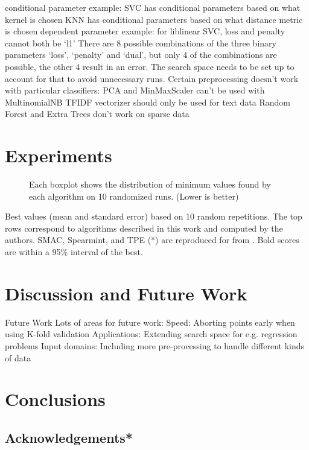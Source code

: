 \documentclass[wcp]{jmlr}
\begin{document}
conditional parameter example:
SVC has conditional parameters based on what kernel is chosen
KNN has conditional parameters based on what distance metric is chosen
dependent parameter example:
for liblinear SVC, loss and penalty cannot both be ‘l1’
There are 8 possible combinations of the three binary parameters ‘loss’, ‘penalty’ and ‘dual’, but only 4 of the combinations are possible, the other 4 result in an error. The search space needs to be set up to account for that to avoid unnecessary runs.
Certain preprocessing doesn’t work with particular classifiers:
PCA and MinMaxScaler can’t be used with MultinomialNB
TFIDF vectorizer should only be used for text data
Random Forest and Extra Trees don’t work on sparse data


\section{Experiments}

\begin{figure}
    \centering
    \caption{
        Each boxplot shows the distribution of minimum values found by each algorithm on 10 randomized runs. (Lower is better)
    }
    \label{fig:boxplots}
\end{figure}



\begin{table}
    \caption{
        Best values (mean and standard error) based on 10 random repetitions.
        The top rows correspond to algorithms described in this work and computed by the authors.
        SMAC, Spearmint, and TPE (*) are reproduced for from \citet{eggensperger+etal:2013}.
        Bold scores are within a 95\% interval of the best.
    }
    \label{tbl:acc}
    \centering
    \small
\end{table}



\section{Discussion and Future Work}
Future Work
Lots of areas for future work:
Speed: Aborting points early when using K-fold validation
Applications: Extending search space for e.g. regression problems
Input domains: Including more pre-processing to handle different kinds of data


\section{Conclusions}


\subsection{Acknowledgements*}


\end{document}
